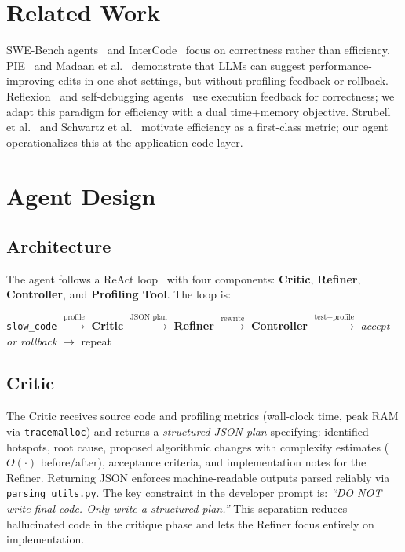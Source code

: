 \documentclass{article}
\begin{document}
\section{Related Work}

SWE-Bench agents~\cite{jimenez2024swebench} and InterCode~\cite{yang2023intercode} focus on correctness rather than efficiency. PIE~\cite{shypula2023pie} and Madaan et al.~\cite{madaan2023chatgpt} demonstrate that LLMs can suggest performance-improving edits in one-shot settings, but without profiling feedback or rollback. Reflexion~\cite{shinn2023reflexion} and self-debugging agents~\cite{chen2023teaching} use execution feedback for correctness; we adapt this paradigm for efficiency with a dual time+memory objective. Strubell et al.~\cite{strubell2019energy} and Schwartz et al.~\cite{schwartz2020green} motivate efficiency as a first-class metric; our agent operationalizes this at the application-code layer.

\section{Agent Design}

\subsection{Architecture}

The agent follows a ReAct loop~\cite{yao2023react} with four components: \textbf{Critic}, \textbf{Refiner}, \textbf{Controller}, and \textbf{Profiling Tool}. The loop is:

\begin{center}
\small
\texttt{slow\_code} $\xrightarrow{\text{profile}}$ \textbf{Critic} $\xrightarrow{\text{JSON plan}}$ \textbf{Refiner} $\xrightarrow{\text{rewrite}}$ \textbf{Controller} $\xrightarrow{\text{test+profile}}$ \textit{accept or rollback} $\rightarrow$ repeat
\end{center}

\subsection{Critic}

The Critic receives source code and profiling metrics (wall-clock time, peak RAM via \texttt{tracemalloc}) and returns a \emph{structured JSON plan} specifying: identified hotspots, root cause, proposed algorithmic changes with complexity estimates ($O(\cdot)$ before/after), acceptance criteria, and implementation notes for the Refiner. Returning JSON enforces machine-readable outputs parsed reliably via \texttt{parsing\_utils.py}. The key constraint in the developer prompt is: \textit{``DO NOT write final code. Only write a structured plan.''} This separation reduces hallucinated code in the critique phase and lets the Refiner focus entirely on implementation.
\end{document}
